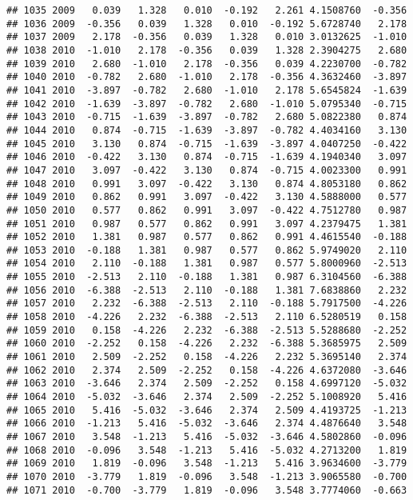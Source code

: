 \documentclass[]{article}
\begin{document}
\begin{verbatim}
## 1035 2009   0.039   1.328   0.010  -0.192   2.261 4.1508760  -0.356
## 1036 2009  -0.356   0.039   1.328   0.010  -0.192 5.6728740   2.178
## 1037 2009   2.178  -0.356   0.039   1.328   0.010 3.0132625  -1.010
## 1038 2010  -1.010   2.178  -0.356   0.039   1.328 2.3904275   2.680
## 1039 2010   2.680  -1.010   2.178  -0.356   0.039 4.2230700  -0.782
## 1040 2010  -0.782   2.680  -1.010   2.178  -0.356 4.3632460  -3.897
## 1041 2010  -3.897  -0.782   2.680  -1.010   2.178 5.6545824  -1.639
## 1042 2010  -1.639  -3.897  -0.782   2.680  -1.010 5.0795340  -0.715
## 1043 2010  -0.715  -1.639  -3.897  -0.782   2.680 5.0822380   0.874
## 1044 2010   0.874  -0.715  -1.639  -3.897  -0.782 4.4034160   3.130
## 1045 2010   3.130   0.874  -0.715  -1.639  -3.897 4.0407250  -0.422
## 1046 2010  -0.422   3.130   0.874  -0.715  -1.639 4.1940340   3.097
## 1047 2010   3.097  -0.422   3.130   0.874  -0.715 4.0023300   0.991
## 1048 2010   0.991   3.097  -0.422   3.130   0.874 4.8053180   0.862
## 1049 2010   0.862   0.991   3.097  -0.422   3.130 4.5888000   0.577
## 1050 2010   0.577   0.862   0.991   3.097  -0.422 4.7512780   0.987
## 1051 2010   0.987   0.577   0.862   0.991   3.097 4.2379475   1.381
## 1052 2010   1.381   0.987   0.577   0.862   0.991 4.4615540  -0.188
## 1053 2010  -0.188   1.381   0.987   0.577   0.862 5.9749020   2.110
## 1054 2010   2.110  -0.188   1.381   0.987   0.577 5.8000960  -2.513
## 1055 2010  -2.513   2.110  -0.188   1.381   0.987 6.3104560  -6.388
## 1056 2010  -6.388  -2.513   2.110  -0.188   1.381 7.6838860   2.232
## 1057 2010   2.232  -6.388  -2.513   2.110  -0.188 5.7917500  -4.226
## 1058 2010  -4.226   2.232  -6.388  -2.513   2.110 6.5280519   0.158
## 1059 2010   0.158  -4.226   2.232  -6.388  -2.513 5.5288680  -2.252
## 1060 2010  -2.252   0.158  -4.226   2.232  -6.388 5.3685975   2.509
## 1061 2010   2.509  -2.252   0.158  -4.226   2.232 5.3695140   2.374
## 1062 2010   2.374   2.509  -2.252   0.158  -4.226 4.6372080  -3.646
## 1063 2010  -3.646   2.374   2.509  -2.252   0.158 4.6997120  -5.032
## 1064 2010  -5.032  -3.646   2.374   2.509  -2.252 5.1008920   5.416
## 1065 2010   5.416  -5.032  -3.646   2.374   2.509 4.4193725  -1.213
## 1066 2010  -1.213   5.416  -5.032  -3.646   2.374 4.4876640   3.548
## 1067 2010   3.548  -1.213   5.416  -5.032  -3.646 4.5802860  -0.096
## 1068 2010  -0.096   3.548  -1.213   5.416  -5.032 4.2713200   1.819
## 1069 2010   1.819  -0.096   3.548  -1.213   5.416 3.9634600  -3.779
## 1070 2010  -3.779   1.819  -0.096   3.548  -1.213 3.9065580  -0.700
## 1071 2010  -0.700  -3.779   1.819  -0.096   3.548 3.7774060  -0.663

\end{verbatim}
\end{document}
